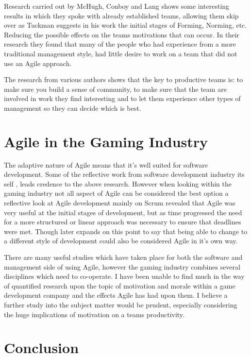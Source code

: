 \documentclass{scrartcl}
\begin{document}
Research carried out by McHugh, Conboy and Lang \cite {AgilePractices} shows some interesting results in which they spoke with already established teams, allowing them skip over as Tuckman \cite {Tuckman} suggests in his work the initial stages of Forming, Norming, etc. Reducing the possible effects on the teams motivations that can occur. In their research they found that many of the people who had experience from a more traditional management style, had little desire to work on a team that did not use an Agile approach.
 
The research from various authors shows that the key to productive teams is: to make sure you build a sense of community, to make sure that the team are involved in work they find interesting and to let them experience other types of management so they can decide which is best.

\section{Agile in the Gaming Industry}

The adaptive nature of Agile means that it's well suited for software development. Some of the reflective work from software development industry its self \cite{Practitioners}, leads credence to the above research. However when looking within the gaming industry not all aspect of Agile can be considered the best option \cite{RyseCrisis} a reflective look at Agile development mainly on Scrum revealed that Agile was very useful at the initial stages of development, but as time progressed the need for a more structured or linear approach was necessary to ensure that deadlines were met. Though later expands on this point to say that being able to change to a different style of development could also be considered Agile in it's own way. 

There are many useful studies which have taken place for both the software and management side of using Agile, however the gaming industry combines several disciplines which need to co-operate. I have been unable to find much in the way of quantified research upon the topic of motivation and morale within a game development company and the effects Agile has had upon them. I believe a further study into the subject matter would be prudent, especially considering the huge implications of motivation on a teams productivity.



\section{Conclusion}
\end{document}
